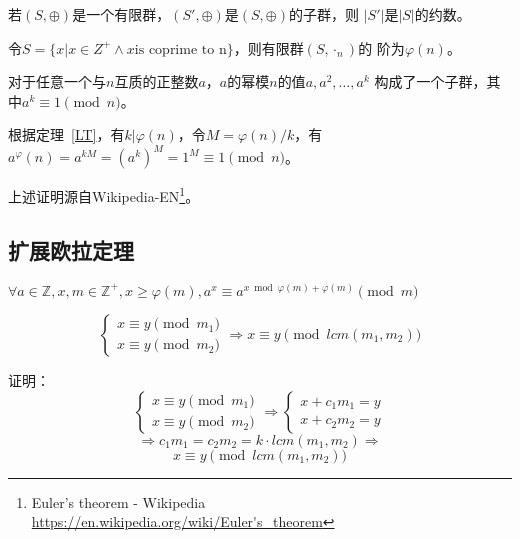 \begin{theorem}\label{LT}
	若$(S,\oplus)$是一个有限群，$(S',\oplus)$是$(S,\oplus)$的子群，则
	$|S'|$是$|S|$的约数。
\end{theorem}

令$S=\{x|x\in Z^+ \land x \textrm{is coprime to n}\}$，则有限群$(S,\cdot_n)$的
阶为$\varphi(n)$。

对于任意一个与$n$互质的正整数$a$，$a$的幂模$n$的值$a,a^2,\ldots,a^k$
构成了一个子群，其中$a^k\equiv 1 \pmod{n}$。

根据定理~\ref{LT}，有$k|\varphi(n)$，令$M=\varphi(n)/k$，有
$a^\varphi(n)=a^{kM}=(a^k)^M=1^M\equiv 1 \pmod{n}$。

上述证明源自Wikipedia-EN\footnote{Euler's theorem - Wikipedia
	\url{https://en.wikipedia.org/wiki/Euler's_theorem}}。
\subsection{扩展欧拉定理}
\begin{theorem}\label{exEuler}
	$\forall a\in \mathbb{Z},x,m\in \mathbb{Z^+},x\geq \varphi(m)
	,a^x\equiv a^{x \bmod \varphi(m)+\varphi(m)} \pmod{m}$
\end{theorem}

\begin{lemma}\label{EEL1}
	\begin{displaymath}
		\left\{
		\begin{array}{l}
			x\equiv y \pmod{m_1} \\
			x\equiv y \pmod{m_2}
		\end{array}
		\right.
		\Rightarrow x\equiv y \pmod{lcm(m_1,m_2)}
	\end{displaymath}
\end{lemma}

证明：
\begin{displaymath}
	\left\{
		\begin{array}{l}
			x\equiv y \pmod{m_1} \\
			x\equiv y \pmod{m_2}
		\end{array}
	\right.
	\Rightarrow
	\left\{
		\begin{array}{l}
			x+c_1m_1=y\\
			x+c_2m_2=y
		\end{array}
	\right.
\end{displaymath}
\begin{displaymath}
	\Rightarrow
	c_1m_1=c_2m_2=k\cdot lcm(m_1,m_2)
	\Rightarrow
\end{displaymath}
\begin{displaymath}
	x \equiv y \pmod{lcm(m_1,m_2)}
\end{displaymath}

